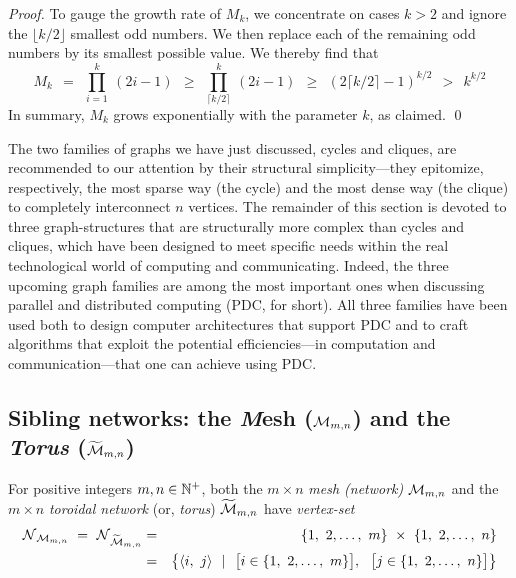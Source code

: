 \begin{proof}
\hspace*{.25in}{\em $M_k$ is the product of the first $k$ odd numbers.}

\noindent
To gauge the growth rate of $M_k$, we concentrate on cases $k > 2$ and
ignore the $\lfloor k/2 \rfloor$ smallest odd numbers.  We then
replace each of the remaining odd numbers by its smallest possible
value.  We thereby find that
\[
M_k \ \ =    \ \ \prod_{i=1}^k \ (2i-1)
    \ \ \geq \ \ \prod_{\lceil k/2 \rceil}^k \ (2i-1)
    \ \ \geq \ \ \left( 2 \lceil k/2 \rceil -1 \right)^{k/2}
    \ \ >    \ \ k^{k/2}
\]
In summary, $M_k$ grows exponentially with the parameter $k$, as claimed.
\qed
\end{proof}


\bigskip

The two families of graphs we have just discussed, cycles and cliques,
are recommended to our attention by their structural simplicity---they
epitomize, respectively, the most sparse way (the cycle) and the most
dense way (the clique) to completely interconnect $n$ vertices.  The
remainder of this section is devoted to three graph-structures that
are structurally more complex than cycles and cliques, which have been
designed to meet specific needs within the real technological world of
computing and communicating.  Indeed, the three upcoming graph
families are among the most important ones when discussing parallel
and distributed computing (PDC, for short).  All three families have
been used both to design computer architectures that support PDC and
to craft algorithms that exploit the potential efficiencies---in
computation and communication---that one can achieve using PDC.

\subsection{Sibling networks: the {\it M}esh ($\mbox{$\cal M$}_{m,n}$) and the {\it Torus} ($\widetilde{\mbox{$\cal M$}}_{m,n}$)}
\label{sec:mesh}

For positive integers $m, n \in \mathbb{N}^+$, both the $m \times n$ {\it mesh
  (network)} $\mbox{$\cal M$}_{m,n}$ and the $m \times n$ {\it toroidal network}
(or, {\it torus}) $\widetilde{\mbox{$\cal M$}}_{m,n}$ have {\it vertex-set}
\begin{eqnarray*}
\n_{\fm_{m,n}} \ = \ \n_{\widetilde{\fm}_{m,n}}
  & = & 
\{1, \ 2, \ldots, \ m\} \ \times \ \{1, \ 2, \ldots, \ n\} \\
  & = & 
\big\{ \langle i, \ j \rangle \ \ | \ \ 
\big[ i \in \{1, \ 2, \ldots, \ m\} \big], \ \
\big[ j \in \{1, \ 2, \ldots, \ n\} \big]
\big\}
\end{eqnarray*}

